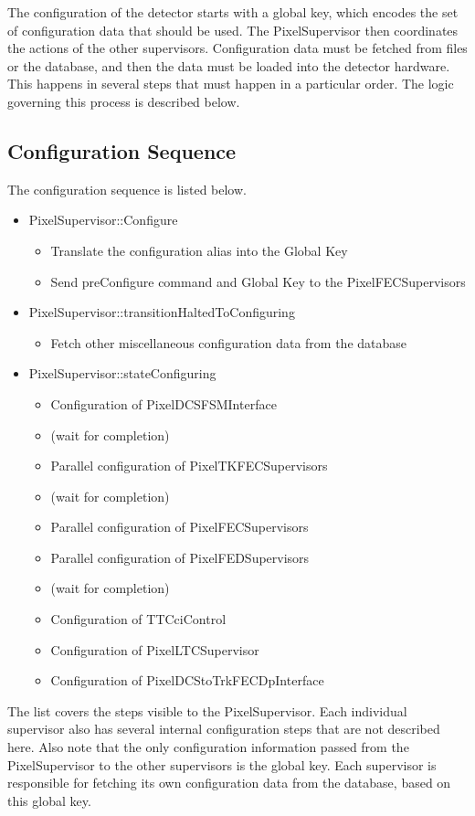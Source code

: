 
The configuration of the detector starts with a global key, which
encodes the set of configuration data that should be used. The
PixelSupervisor then coordinates the actions of the other
supervisors. Configuration data must be fetched from files or the
database, and then the data must be loaded into the detector
hardware. This happens in several steps that must happen in a
particular order. The logic governing this process is described below.

\subsection{Configuration Sequence}
The configuration sequence is listed below.
\begin{itemize}
\item PixelSupervisor::Configure
\begin{itemize}
\item Translate the configuration alias into the Global Key
\item Send preConfigure command and Global Key to the PixelFECSupervisors
\end{itemize}
\item PixelSupervisor::transitionHaltedToConfiguring
\begin{itemize}
\item Fetch other miscellaneous configuration data from the database
\end{itemize}
\item PixelSupervisor::stateConfiguring
\begin{itemize}
\item Configuration of PixelDCSFSMInterface
\item (wait for completion)
\item Parallel configuration of PixelTKFECSupervisors
\item (wait for completion)
\item Parallel configuration of PixelFECSupervisors
\item Parallel configuration of PixelFEDSupervisors
\item (wait for completion)
\item Configuration of TTCciControl
\item Configuration of PixelLTCSupervisor
\item Configuration of PixelDCStoTrkFECDpInterface
\end{itemize}
\end{itemize}
The list covers the steps visible to the PixelSupervisor. Each
individual supervisor also has several internal configuration steps
that are not described here. Also note that the only configuration
information passed from the PixelSupervisor to the other supervisors
is the global key. Each supervisor is responsible for fetching its own
configuration data from the database, based on this global key.

